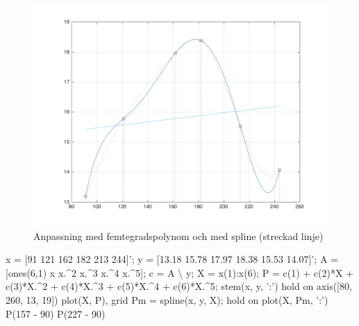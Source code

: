 \documentclass[10,]{article}
\newenvironment{Shaded}{}{}
\newcommand{\FloatTok}[1]{\textcolor[rgb]{0.25,0.63,0.44}{{#1}}}
\newcommand{\StringTok}[1]{\textcolor[rgb]{0.25,0.44,0.63}{{#1}}}
\newcommand{\NormalTok}[1]{{#1}}
\begin{document}
\begin{figure}[htbp]
\centering
\includegraphics{fig1a.png}
\caption{Anpassning med femtegradspolynom och med spline (streckad
linje)\label{fig:fig1a}}
\end{figure}

\begin{Shaded}
\begin{Highlighting}[]
\NormalTok{x = [}\FloatTok{91} \FloatTok{121} \FloatTok{162} \FloatTok{182} \FloatTok{213} \FloatTok{244}\NormalTok{]';}
\NormalTok{y = [}\FloatTok{13.18} \FloatTok{15.78} \FloatTok{17.97} \FloatTok{18.38} \FloatTok{15.53} \FloatTok{14.07}\NormalTok{]';}
\NormalTok{A = [ones(}\FloatTok{6}\NormalTok{,}\FloatTok{1}\NormalTok{) x x.^}\FloatTok{2} \NormalTok{x.^}\FloatTok{3} \NormalTok{x.^}\FloatTok{4} \NormalTok{x.^}\FloatTok{5}\NormalTok{];}
\NormalTok{c = A \textbackslash{} y;}
\NormalTok{X = x(}\FloatTok{1}\NormalTok{):x(}\FloatTok{6}\NormalTok{);}
\NormalTok{P = c(}\FloatTok{1}\NormalTok{) + c(}\FloatTok{2}\NormalTok{)*X + c(}\FloatTok{3}\NormalTok{)*X.^}\FloatTok{2} \NormalTok{+ c(}\FloatTok{4}\NormalTok{)*X.^}\FloatTok{3} \NormalTok{+ c(}\FloatTok{5}\NormalTok{)*X.^}\FloatTok{4} \NormalTok{+ c(}\FloatTok{6}\NormalTok{)*X.^}\FloatTok{5}\NormalTok{;}
\NormalTok{stem(x, y, }\StringTok{':'}\NormalTok{)}
\NormalTok{hold on}
\NormalTok{axis([}\FloatTok{80}\NormalTok{, }\FloatTok{260}\NormalTok{, }\FloatTok{13}\NormalTok{, }\FloatTok{19}\NormalTok{])}
\NormalTok{plot(X, P), grid}
\NormalTok{Pm = spline(x, y, X);}
\NormalTok{hold on}
\NormalTok{plot(X, Pm, }\StringTok{':'}\NormalTok{)}
\NormalTok{P(}\FloatTok{157} \NormalTok{- }\FloatTok{90}\NormalTok{)}
\NormalTok{P(}\FloatTok{227} \NormalTok{- }\FloatTok{90}\NormalTok{)}
\end{Highlighting}
\end{Shaded}
\end{document}
